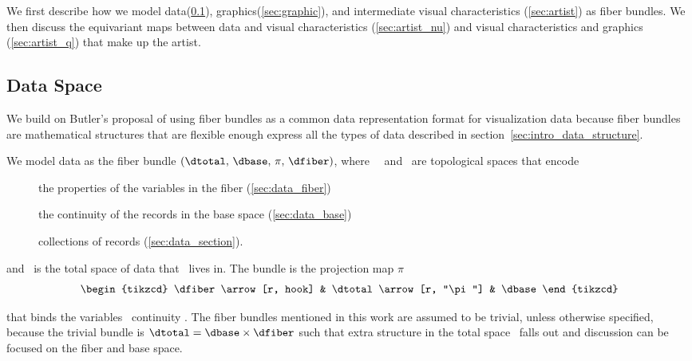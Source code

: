 \documentclass[../main.tex]{subfiles}
\begin{document}
We first describe how we model data(\ref{sec:data}), graphics(\ref{sec:graphic}), and intermediate visual characteristics (\ref{sec:artist}) as fiber bundles. We then discuss the equivariant maps between data and visual characteristics (\ref{sec:artist_nu}) and visual characteristics and graphics (\ref{sec:artist_q}) that make up the artist.

\subsection{Data Space\dtotal}
\label{sec:data}
We build on Butler's proposal of using fiber bundles as a common data representation format for visualization data\cite{butlerVectorBundleClassesForm1992, butlerVisualizationModelBased1989} because fiber bundles are mathematical structures that are flexible enough express all the types of data described in section~\ref{sec:intro_data_structure}.

We model data as the fiber bundle $(\dtotal,\,\dbase,\,\pi ,\,\dfiber)$, where \dtotal\, \dfiber\, and \dbase\ are topological spaces that encode 
\begin{description}
\item[\dfiber] the properties of the variables in the fiber (\ref{sec:data_fiber})
\item[\dbase] the continuity of the records in the base space (\ref{sec:data_base})
\item[\dsection] collections of records (\ref{sec:data_section}). 
\end{description}

and \dtotal\ is the total space of data that \dfiber\ lives in. The bundle is the projection map $\pi$
\begin{equation}
    \label{eq:fiber_bundle}
    \begin{tikzcd}
        \dfiber \arrow[r, hook] & \dtotal \arrow[r, "\pi"] & \dbase
    \end{tikzcd}
\end{equation}

that binds the variables \dfiber\ continuity \dbase. The fiber bundles mentioned in this work are assumed to be trivial\cite{spanier1989algebraic,LocallyTrivialFibre}, unless otherwise specified, because the trivial bundle is $\dtotal=\dbase\times \dfiber$ such that extra structure in the total space \dtotal\ falls out and discussion can be focused on the fiber and base space. 
\end{document}
